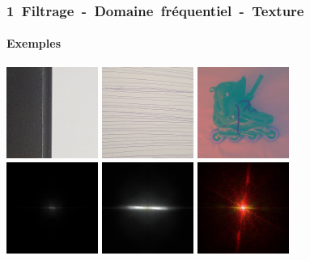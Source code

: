 \documentclass[french]{beamer}
\begin{document}
\begin{frame}
	\frametitle{\mbox{1 Filtrage - Domaine fréquentiel - Texture}}
	\framesubtitle{Exemples}
	\includegraphics[width=3cm]{images/test2.png} \includegraphics[width=3cm]{images/test1.png} \includegraphics[width=3cm]{images/roller_lab.jpg} \\ 
	\includegraphics[width=3cm]{images/test2_fft.jpg} \includegraphics[width=3cm]{images/test1_fft.jpg} \includegraphics[width=3cm]{images/roller_fft.jpg}	
\end{frame}
\end{document}
